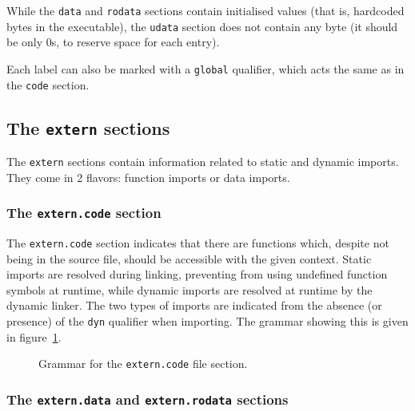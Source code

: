 While the \texttt{data} and \texttt{rodata} sections contain initialised values (that is, hardcoded bytes in the executable), the \texttt{udata} section does not contain any byte (it should be only $0$s, to reserve space for each entry).

Each label can also be marked with a \texttt{global} qualifier, which acts the same as in the \texttt{code} section.

\subsection{The \texttt{extern} sections}\label{subsec:nstar-common-sections-extern}

The \texttt{extern} sections contain information related to static and dynamic imports.
They come in 2 flavors: function imports or data imports.

\subsubsection{The \texttt{extern.code} section}\label{subsubsec:nstar-common-sections-extern-code}

The \texttt{extern.code} section indicates that there are functions which, despite not being in the source file, should be accessible with the given context.
Static imports are resolved during linking, preventing from using undefined function symbols at runtime, while dynamic imports are resolved at runtime by the dynamic linker.
The two types of imports are indicated from the absence (or presence) of the \texttt{dyn} qualifier when importing.
The grammar showing this is given in figure~\ref{fig:nstar-common-sections-extern-code-grammar}.

\begin{figure}[htb]
  \centering


  \caption{Grammar for the \texttt{extern.code} file section.}
  \label{fig:nstar-common-sections-extern-code-grammar}
\end{figure}

\subsubsection{The \texttt{extern.data} and \texttt{extern.rodata} sections}\label{subsubsec:nstar-common-sections-extern-data}

